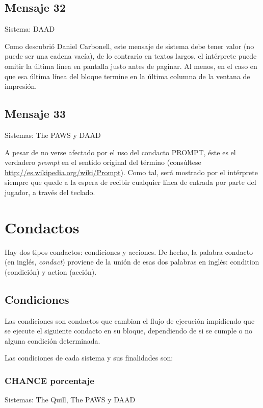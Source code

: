 \documentclass[11pt, a5paper]{article}
\newcommand{\quill}{\textsf{The Quill}\xspace}
\newcommand{\paw}{\textsf{The PAWS}\xspace}
\newcommand{\daad}{\textsf{DAAD}\xspace}
\newcommand{\sistema}[1]{\noindent Sistema: #1 \nopagebreak}
\newcommand{\sistemas}[1]{\noindent Sistemas: #1 \nopagebreak}
\begin{document}
\subsection{Mensaje 32}

\sistema{\daad}

Como descubrió Daniel Carbonell, este mensaje de sistema debe tener valor (no puede ser una cadena vacía), de lo contrario en textos largos, el intérprete puede omitir la última línea en pantalla justo antes de paginar. Al menos, en el caso en que esa última línea del bloque termine en la última columna de la ventana de impresión.

\subsection{Mensaje 33}

\sistemas{\paw y \daad}

A pesar de no verse afectado por el uso del condacto PROMPT, éste es el verdadero \emph{prompt} en el sentido original del término (consúltese \url{http://es.wikipedia.org/wiki/Prompt}). Como tal, será mostrado por el intérprete siempre que quede a la espera de recibir cualquier línea de entrada por parte del jugador, a través del teclado.


\section{Condactos}

Hay dos tipos condactos: condiciones y acciones. De hecho, la palabra condacto (en inglés, \emph{condact}) proviene de la unión de esas dos palabras en inglés: condition (condición) y action (acción).

\subsection{Condiciones}

Las condiciones son condactos que cambian el flujo de ejecución impidiendo que se ejecute el siguiente condacto en su bloque, dependiendo de si se cumple o no alguna condición determinada.

Las condiciones de cada sistema y sus finalidades son:

\subsubsection{CHANCE porcentaje}

\sistemas{\quill, \paw y \daad}
\end{document}
